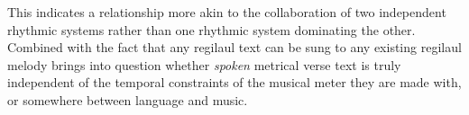 This indicates a relationship more akin to the collaboration of two independent rhythmic systems rather than one rhythmic system dominating the other. Combined with the fact that any regilaul text can be sung to any existing regilaul melody brings into question whether {\it spoken} metrical verse text is truly independent of the temporal constraints of the musical meter they are made with, or somewhere between language and music. 
